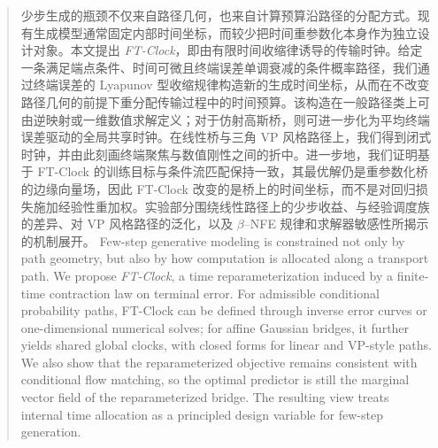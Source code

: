 \begin{abstract}
\ifinternalcn
少步生成的瓶颈不仅来自路径几何，也来自计算预算沿路径的分配方式。现有生成模型通常固定内部时间坐标，而较少把时间重参数化本身作为独立设计对象。本文提出 \emph{FT-Clock}，即由有限时间收缩律诱导的传输时钟。给定一条满足端点条件、时间可微且终端误差单调衰减的条件概率路径，我们通过终端误差的 Lyapunov 型收缩规律构造新的生成时间坐标，从而在不改变路径几何的前提下重分配传输过程中的时间预算。该构造在一般路径类上可由逆映射或一维数值求解定义；对于仿射高斯桥，则可进一步化为平均终端误差驱动的全局共享时钟。在线性桥与三角 VP 风格路径上，我们得到闭式时钟，并由此刻画终端聚焦与数值刚性之间的折中。进一步地，我们证明基于 FT-Clock 的训练目标与条件流匹配保持一致，其最优解仍是重参数化桥的边缘向量场，因此 FT-Clock 改变的是桥上的时间坐标，而不是对回归损失施加经验性重加权。实验部分围绕线性路径上的少步收益、与经验调度族的差异、对 VP 风格路径的泛化，以及 $\beta$--NFE 规律和求解器敏感性所揭示的机制展开。
\else
Few-step generative modeling is constrained not only by path geometry, but also by how computation is allocated along a transport path. We propose \emph{FT-Clock}, a time reparameterization induced by a finite-time contraction law on terminal error. For admissible conditional probability paths, FT-Clock can be defined through inverse error curves or one-dimensional numerical solves; for affine Gaussian bridges, it further yields shared global clocks, with closed forms for linear and VP-style paths. We also show that the reparameterized objective remains consistent with conditional flow matching, so the optimal predictor is still the marginal vector field of the reparameterized bridge. The resulting view treats internal time allocation as a principled design variable for few-step generation.
\fi
\end{abstract}
